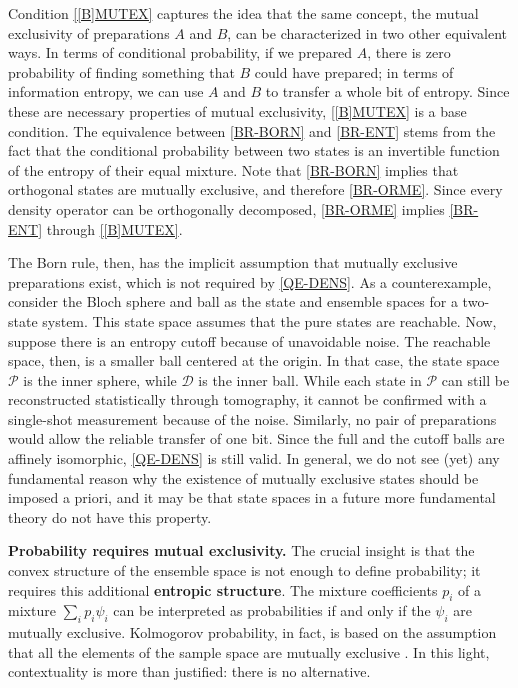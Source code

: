 \documentclass[entropy,article,submit,moreauthors]{Definitions/mdpi}
\begin{document}
Condition \ref{[B]MUTEX} captures the idea that the same concept, the mutual exclusivity of preparations $A$ and $B$, can be characterized in two other equivalent ways. In terms of conditional probability, if we prepared $A$, there is zero probability of finding something that $B$ could have prepared; in terms of information entropy, we can use $A$ and $B$ to transfer a whole bit of entropy. Since these are necessary properties of mutual exclusivity, \ref{[B]MUTEX} is a base condition. The equivalence between \ref{BR-BORN} and \ref{BR-ENT} stems from the fact that the conditional probability between two states is an invertible function of the entropy of their equal mixture. Note that \ref{BR-BORN} implies that orthogonal states are mutually exclusive, and therefore \ref{BR-ORME}. Since every density operator can be orthogonally decomposed, \ref{BR-ORME} implies \ref{BR-ENT} through \ref{[B]MUTEX}.

The Born rule, then, has the implicit assumption that mutually exclusive preparations exist, which is not required by \ref{QE-DENS}. As a counterexample, consider the Bloch sphere and ball as the state and ensemble spaces for a two-state system. This state space assumes that the pure states are reachable. Now, suppose there is an entropy cutoff because of unavoidable noise. The reachable space, then, is a smaller ball centered at the origin. In that case, the state space $\mathcal{P}$ is the inner sphere, while $\mathcal{D}$ is the inner ball. While each state in $\mathcal{P}$ can still be reconstructed statistically through tomography, it cannot be confirmed with a single-shot measurement because of the noise. Similarly, no pair of preparations would allow the reliable transfer of one bit. Since the full and the cutoff balls are affinely isomorphic, \ref{QE-DENS} is still valid. In general, we do not see (yet) any fundamental reason why the existence of mutually exclusive states should be imposed a priori, and it may be that state spaces in a future more fundamental theory do not have this property.

\textbf{Probability requires mutual exclusivity.} The crucial insight is that the convex structure of the ensemble space is not enough to define probability; it requires this additional \textbf{entropic structure}. The mixture coefficients $p_i$ of a mixture $\sum_i p_i \psi_i$ can be interpreted as probabilities if and only if the $\psi_i$ are mutually exclusive. Kolmogorov probability, in fact, is based on the assumption that all the elements of the sample space are mutually exclusive \cite{BertsekasTsitsiklis2008}. In this light, contextuality is more than justified: there is no alternative.
\end{document}
